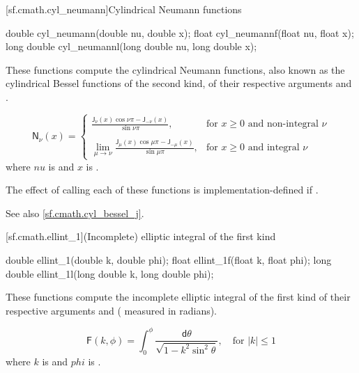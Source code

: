 [sf.cmath.cyl_neumann]{Cylindrical Neumann functions}%
%
%
%
%
%
%
\begin{itemdecl}
double       cyl_neumann(double nu, double x);
float        cyl_neumannf(float nu, float x);
long double  cyl_neumannl(long double nu, long double x);
\end{itemdecl}

\begin{itemdescr}

\pnum\effects
These functions compute the cylindrical Neumann functions,
also known as the cylindrical Bessel functions of the second kind,
of their respective arguments
 and .

\pnum\returns
\[%
  \mathsf{N}_\nu(x) =
  \left\{
  \begin{array}{cl}
  \displaystyle
  \frac{\mathsf{J}_\nu(x) \cos \nu\pi - \mathsf{J}_{-\nu}(x)}
       {\sin \nu\pi },
  & \mbox{for $x \ge 0$ and non-integral $\nu$}
  \\
  \\
  \displaystyle
  \lim_{\mu \rightarrow \nu} \frac{\mathsf{J}_\mu(x) \cos \mu\pi - \mathsf{J}_{-\mu}(x)}
                                {\sin \mu\pi },
  & \mbox{for $x \ge 0$ and integral $\nu$}
  \end{array}
  \right.
\]
where
$nu$ is  and
$x$ is .

\pnum\remark
The effect of calling each of these functions
is implementation-defined
if .

\pnum See also \ref{sf.cmath.cyl_bessel_j}.
\end{itemdescr}

[sf.cmath.ellint_1]{(Incomplete) elliptic integral of the first kind}%
%
%
%
%
%
\begin{itemdecl}
double       ellint_1(double k, double phi);
float        ellint_1f(float k, float phi);
long double  ellint_1l(long double k, long double phi);
\end{itemdecl}

\begin{itemdescr}

\pnum\effects
These functions compute
the incomplete elliptic integral of the first kind
of their respective arguments
 and  ( measured in radians).

\pnum\returns
\[%
  \mathsf{F}(k, \phi) =
  \int_0^\phi \! \frac{\mathsf{d}\theta}
                      {\sqrt{1 - k^2 \sin^2 \theta}},
	   \quad \mbox{for $|k| \le 1$}
\]
where
$k$ is  and
$phi$ is .
\end{itemdescr}

